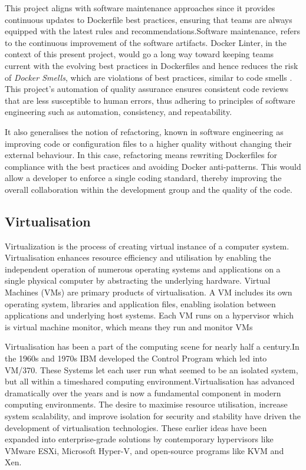     This project aligns with software maintenance approaches since it provides continuous updates to Dockerfile best practices, ensuring that teams are always equipped with the latest rules and recommendations.Software maintenance, refers to the continuous improvement of the software artifacts\cite{canfora2001softwaremaintenance}. Docker Linter, in the context of this present project, would go a long way toward keeping teams current with the evolving best practices in Dockerfiles and hence reduces the risk of \textit{Docker Smells}, which are violations of best practices, similar to code smells \cite{DockerSmellEmpherical}. This project's automation of quality assurance ensures consistent code reviews that are less susceptible to human errors, thus adhering to principles of software engineering such as automation, consistency, and repeatability. \cite{softwareEng}
    
    It also generalises the notion of refactoring, known in software engineering as improving code or configuration files to a higher quality without changing their external behaviour. \cite{refactoring} In this case, refactoring means rewriting Dockerfiles for compliance with the best practices and avoiding Docker anti-patterns. This would allow a developer to enforce a single coding standard, thereby improving the overall collaboration within the development group and the quality of the code.
\subsection{Virtualisation}
    Virtualization is the process of creating virtual instance of a computer system.\cite{ConVSVirt} Virtualisation enhances resource efficiency and utilisation by enabling the independent operation of numerous operating systems and applications on a single physical computer by abstracting the underlying hardware. Virtual Machines (VMs) are primary products of virtualisation. A VM includes its own operating system, libraries and application files, enabling isolation between applications and underlying host systems. Each VM runs on a hypervisor which is virtual machine monitor, which means they run and monitor VMs\cite{ConVSVirt}
   
    Virtualisation has been a part of the computing scene for nearly half a century.In the 1960s and 1970s IBM developed the Control Program which led into VM/370.\cite{Virt2013} These Systems let each user run what seemed to be an isolated system, but all within a timeshared computing environment.Virtualisation has advanced dramatically over the years and is now a fundamental component in modern computing environments. The desire to maximise resource utilisation, increase system scalability, and improve isolation for security and stability have driven the development of virtualisation technologies. These earlier ideas have been expanded into enterprise-grade solutions by contemporary hypervisors like VMware ESXi, Microsoft Hyper-V, and open-source programs like KVM and Xen.\cite{Virt2013}

